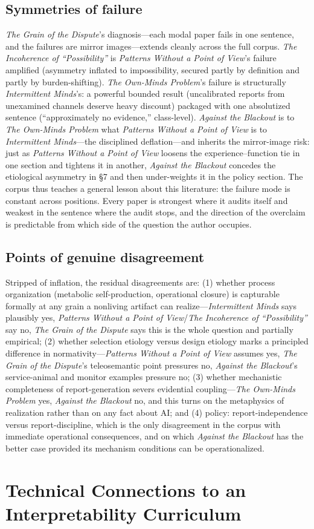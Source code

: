 \documentclass[11pt]{article}
\newcommand{\IM}{\emph{Intermittent Minds}}
\newcommand{\PP}{\emph{Patterns Without a Point of View}}
\newcommand{\IC}{\emph{The Incoherence of ``Possibility''}}
\newcommand{\GD}{\emph{The Grain of the Dispute}}
\newcommand{\OM}{\emph{The Own-Minds Problem}}
\newcommand{\AB}{\emph{Against the Blackout}}
\begin{document}
\subsection{Symmetries of failure}
\GD{}'s diagnosis---each modal paper fails in one sentence, and the failures are mirror images---extends cleanly across the full corpus. \IC{} is \PP{}'s failure amplified (asymmetry inflated to impossibility, secured partly by definition and partly by burden-shifting). \OM{}'s failure is structurally \IM{}'s: a powerful bounded result (uncalibrated reports from unexamined channels deserve heavy discount) packaged with one absolutized sentence (``approximately no evidence,'' class-level). \AB{} is to \OM{} what \PP{} is to \IM{}---the disciplined deflation---and inherits the mirror-image risk: just as \PP{} loosens the experience--function tie in one section and tightens it in another, \AB{} concedes the etiological asymmetry in \S 7 and then under-weights it in the policy section. The corpus thus teaches a general lesson about this literature: the failure mode is constant across positions. Every paper is strongest where it audits itself and weakest in the sentence where the audit stops, and the direction of the overclaim is predictable from which side of the question the author occupies.

\subsection{Points of genuine disagreement}
Stripped of inflation, the residual disagreements are: (1) whether process organization (metabolic self-production, operational closure) is capturable formally at any grain a nonliving artifact can realize---\IM{} says plausibly yes, \PP{}/\IC{} say no, \GD{} says this is the whole question and partially empirical; (2) whether selection etiology versus design etiology marks a principled difference in normativity---\PP{} assumes yes, \GD{}'s teleosemantic point pressures no, \AB{}'s service-animal and monitor examples pressure no; (3) whether mechanistic completeness of report-generation severs evidential coupling---\OM{} yes, \AB{} no, and this turns on the metaphysics of realization rather than on any fact about AI; and (4) policy: report-independence versus report-discipline, which is the only disagreement in the corpus with immediate operational consequences, and on which \AB{} has the better case provided its mechanism conditions can be operationalized.

\section{Technical Connections to an Interpretability Curriculum}
\end{document}
